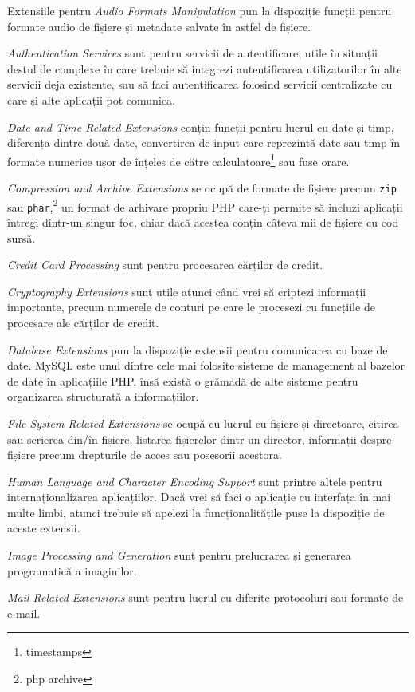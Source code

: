 Extensiile pentru \textit{Audio Formats Manipulation} pun
la dispoziție funcții pentru formate audio de fișiere și metadate
salvate în astfel de fișiere.

\textit{Authentication Services} sunt pentru servicii de autentificare,
utile în situații destul de complexe în care trebuie să integrezi
autentificarea utilizatorilor în alte servicii deja existente, sau să
faci autentificarea folosind servicii centralizate cu care și alte aplicații pot
comunica.

\textit{Date and Time Related Extensions} conțin funcții pentru
lucrul cu date și timp, diferența dintre două date, convertirea
de input care reprezintă date sau timp în formate numerice ușor
de înțeles de către calculatoare\footnote{timestamps} sau fuse orare.

\textit{Compression and Archive Extensions} se ocupă de formate
de fișiere precum \texttt{zip} sau \texttt{phar},\footnote{php archive}
un format de arhivare propriu PHP care-ți permite să incluzi aplicații
întregi dintr-un singur foc, chiar dacă acestea conțin câteva mii
de fișiere cu cod sursă.

\textit{Credit Card Processing} sunt pentru procesarea cărților de credit.

\textit{Cryptography Extensions} sunt utile atunci când vrei să
criptezi informații importante, precum numerele de conturi pe care le
procesezi cu funcțiile de procesare ale cărților de credit.

\textit{Database Extensions} pun la dispoziție extensii pentru
comunicarea cu baze de date. MySQL este unul dintre cele mai folosite
sisteme de management al bazelor de date în aplicațiile
PHP, însă există o grămadă de alte sisteme pentru organizarea
structurată a informațiilor.

\textit{File System Related Extensions} se ocupă cu lucrul cu
fișiere și directoare, citirea sau scrierea din/în fișiere,
listarea fișierelor dintr-un director, informații despre fișiere
precum drepturile de acces sau posesorii acestora.

\textit{Human Language and Character Encoding Support} sunt
printre altele pentru internaționalizarea aplicațiilor.
Dacă vrei să faci o aplicație cu interfața în mai multe
limbi, atunci trebuie să apelezi la funcționalitățile
puse la dispoziție de aceste extensii.

\textit{Image Processing and Generation} sunt pentru
prelucrarea și generarea programatică a imaginilor.

\textit{Mail Related Extensions} sunt pentru
lucrul cu diferite protocoluri sau formate de e-mail.


